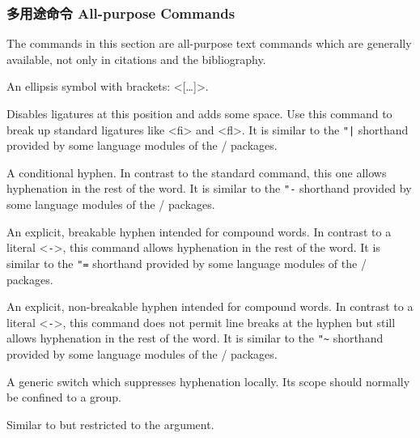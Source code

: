 \subsubsection{多用途命令 All-purpose Commands}
\label{use:fmt:aux}

The commands in this section are all-purpose text commands which are generally available, not only in citations and the bibliography.

\begin{ltxsyntax}


An ellipsis symbol with brackets: <[\dots\unkern]>.


Disables ligatures at this position and adds some space. Use this command to break up standard ligatures like <fi> and <fl>. It is similar to the \verb+"|+ shorthand provided by some language modules of the / packages.


A conditional hyphen. In contrast to the standard \cmd{-} command, this one allows hyphenation in the rest of the word. It is similar to the \verb|"-| shorthand provided by some language modules of the / packages.


An explicit, breakable hyphen intended for compound words. In contrast to a literal <\texttt{-}>, this command allows hyphenation in the rest of the word. It is similar to the \verb|"=| shorthand provided by some language modules of the / packages.


An explicit, non-breakable hyphen intended for compound words. In contrast to a literal <\texttt{-}>, this command does not permit line breaks at the hyphen but still allows hyphenation in the rest of the word. It is similar to the \verb|"~| shorthand provided by some language modules of the / packages.


A generic switch which suppresses hyphenation locally. Its scope should normally be confined to a group.


Similar to  but restricted to the  argument.



\end{ltxsyntax}
